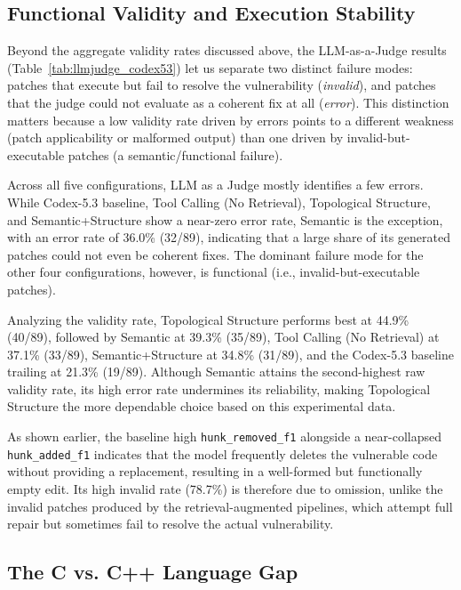 \subsection*{Functional Validity and Execution Stability}

Beyond the aggregate validity rates discussed above, the LLM-as-a-Judge results (Table~\ref{tab:llmjudge_codex53}) let us separate two distinct failure modes: patches that execute but fail to resolve the vulnerability (\textit{invalid}), and patches that the judge could not evaluate as a coherent fix at all (\textit{error}). This distinction matters because a low validity rate driven by errors points to a different weakness (patch applicability or malformed output) than one driven by invalid-but-executable patches (a semantic/functional failure).

Across all five configurations, LLM as a Judge mostly identifies a few errors. While Codex-5.3 baseline, Tool Calling (No Retrieval), Topological Structure, and Semantic+Structure show a near-zero error rate, Semantic is the exception, with an error rate of 36.0\% (32/89), indicating that a large share of its generated patches could not even be coherent fixes. The dominant failure mode for the other four configurations, however, is functional (i.e., invalid-but-executable patches).

Analyzing the validity rate, Topological Structure performs best at 44.9\% (40/89), followed by Semantic at 39.3\% (35/89), Tool Calling (No Retrieval) at 37.1\% (33/89), Semantic+Structure at 34.8\% (31/89), and the Codex-5.3 baseline trailing at 21.3\% (19/89). Although Semantic attains the second-highest raw validity rate, its high error rate undermines its reliability, making Topological Structure the more dependable choice based on this experimental data.

As shown earlier, the baseline high \texttt{hunk\_removed\_f1} alongside a near-collapsed \texttt{hunk\_added\_f1} indicates that the model frequently deletes the vulnerable code without providing a replacement, resulting in a well-formed but functionally empty edit. Its high invalid rate (78.7\%) is therefore due to omission, unlike the invalid patches produced by the retrieval-augmented pipelines, which attempt full repair but sometimes fail to resolve the actual vulnerability.

\subsection*{The C vs. C++ Language Gap}

